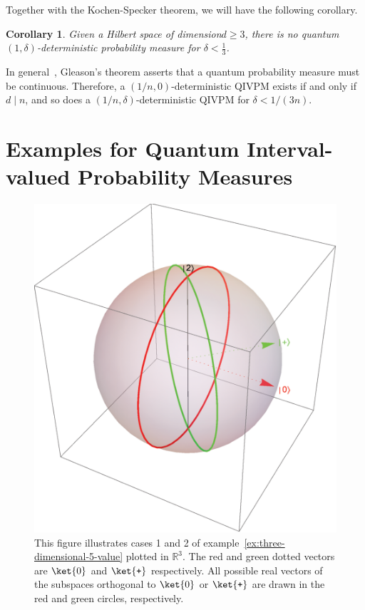 \documentclass[12pt]{iopart}
\theoremstyle{plain}
\newtheorem{cor}[thm]{Corollary}
\theoremstyle{definition}
\theoremstyle{remark}
\newcommand{\ps}{\texttt{+}}
\newcommand{\nb}{\nolinebreak[1] }
\begin{document}
Together with the Kochen-Specker theorem, we will have the following
corollary.

\begin{cor}\label{cor:Kochen-Specker-IVPM}Given a Hilbert space
of dimension\nb$d\ge3$, there is no quantum $\left(1,\delta\right)$-deterministic
probability measure for $\delta<\frac{1}{3}$.\end{cor}

In general~\cite{Redhead1987-REDINA}, Gleason's theorem asserts
that a quantum probability measure must be continuous. Therefore,
a $\left(1/n,0\right)$-deterministic QIVPM exists if and only if
$d\mid n$, and so does a $\left(1/n,\delta\right)$-deterministic
QIVPM for $\delta<1/\left(3n\right)$.



\section{Examples for Quantum Interval-valued Probability Measures\label{sec:Examples-for-QuantumIVPM}}

\begin{figure}
\begin{centering}
\includegraphics[scale=0.38]{figureE1} 
\par\end{centering}
\caption{\label{fig:three-dimensional-5-value}This figure illustrates cases
1 and 2 of example~\ref{ex:three-dimensional-5-value} plotted in
$\mathbb{R}^{3}$. The red and green dotted vectors are $\ket{0}$
and $\ket{\ps}$ respectively. All possible real vectors of the subspaces
orthogonal to $\ket{0}$ or $\ket{\ps}$ are drawn in the red and
green circles, respectively.}
\end{figure}
\end{document}
